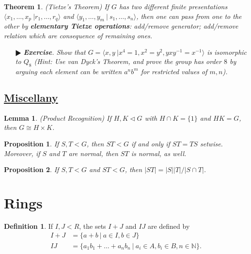 \documentclass[11pt]{amsart}
\newtheorem*{theorem*}{Theorem}
\newtheorem*{lemma*}{Lemma}
\newtheorem*{proposition*}{Proposition}
\theoremstyle{definition}
\newtheorem*{definition*}{Definition}
\renewcommand\:{\colon}
\newcommand{\N}{\mathds{N}}
\newcommand{\1}{\mathds{1}}
\newcommand{\exc}[1]{\vspace{-2.5pt}\begin{itemize}[leftmargin=15pt]\item[$\RHD$] \textit{\textbf{Exercise}. #1}\end{itemize}}
\begin{document}
\begin{theorem*}
	\textnormal{(Tietze's Theorem)} If $G$ has two different finite presentations $\langle x_1, \dots, x_p \ | r_1, \dots, r_q \rangle$ and $\langle y_1, \dots, y_m \ | \ s_1, \dots, s_n \rangle$, then one can pass from one to the other by \textbf{elementary Tietze operations}: add/remove generator; add/remove relation which are consequence of remaining ones.
\end{theorem*}

\exc{Show that  $G = \langle x, y \ | x^4 = 1, x^2 = y^2, yxy^{-1} = x^{-1} \rangle$ is isomorphic to $Q_8$ (Hint: Use van Dyck's Theorem, and prove the group has order $8$ by arguing each element can be written $a^nb^m$ for restricted values of $m, n$).}

\vskip20pt




\subsection*{\underline{Miscellany}}

\begin{lemma*}
	\textnormal{(Product Recognition)} If $H, K \triangleleft G$ with $H \cap K = \{1\}$ and $HK = G$, then $G \cong H \times K$.
\end{lemma*}

\begin{proposition*}
	If $S, T < G$, then $ST < G$ if and only if $ST = TS$ setwise. Moreover, if $S$ and $T$ are normal, then $ST$ is normal, as well.
\end{proposition*}

\begin{proposition*}
	If $S, T < G$ and $ST < G$, then $\displaystyle |ST| = |S||T|/|S \cap T|$.
\end{proposition*}


\clearpage










\section{Rings}

\begin{definition*}
		If $I, J < R$, the sets $I + J$ and $I J$ are defined by
		\begin{align*}
			I + J &= \{ a + b \ | \ a \in I, b \in J \} \\
			IJ &= \{a_1b_1 + \dots + a_nb_n \ | \ a_i \in A, b_i \in B, n \in \N \}.
		\end{align*}
\end{definition*}
\end{document}
